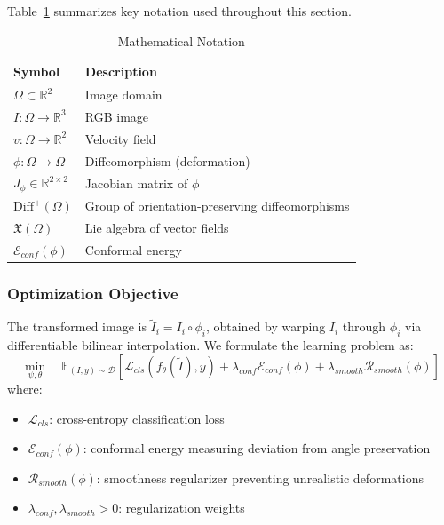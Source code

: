 Table~\ref{tab:notation} summarizes key notation used throughout this section.

\begin{table}[t]
\centering
\caption{Mathematical Notation}
\label{tab:notation}
\begin{tabular}{ll}
\hline
\textbf{Symbol} & \textbf{Description} \\
\hline
$\Omega \subset \mathbb{R}^2$ & Image domain \\
$I: \Omega \rightarrow \mathbb{R}^3$ & RGB image \\
$v: \Omega \rightarrow \mathbb{R}^2$ & Velocity field \\
$\phi: \Omega \rightarrow \Omega$ & Diffeomorphism (deformation) \\
$J_\phi \in \mathbb{R}^{2 \times 2}$ & Jacobian matrix of $\phi$ \\
$\text{Diff}^+(\Omega)$ & Group of orientation-preserving diffeomorphisms \\
$\mathfrak{X}(\Omega)$ & Lie algebra of vector fields \\
$\mathcal{E}_{conf}(\phi)$ & Conformal energy \\
\hline
\end{tabular}
\end{table}

\subsubsection{Optimization Objective}

The transformed image is $\tilde{I}_i = I_i \circ \phi_i$, obtained by warping $I_i$ through $\phi_i$ via differentiable bilinear interpolation. We formulate the learning problem as:
\begin{equation}
\min_{\psi, \theta} \quad \mathbb{E}_{(I,y) \sim \mathcal{D}} \left[ \mathcal{L}_{cls}(f_\theta(\tilde{I}), y) + \lambda_{conf} \mathcal{E}_{conf}(\phi) + \lambda_{smooth} \mathcal{R}_{smooth}(\phi) \right]
\label{eq:objective}
\end{equation}
where:
\begin{itemize}
    \item $\mathcal{L}_{cls}$: cross-entropy classification loss
    \item $\mathcal{E}_{conf}(\phi)$: conformal energy measuring deviation from angle preservation
    \item $\mathcal{R}_{smooth}(\phi)$: smoothness regularizer preventing unrealistic deformations
    \item $\lambda_{conf}, \lambda_{smooth} > 0$: regularization weights
\end{itemize}


